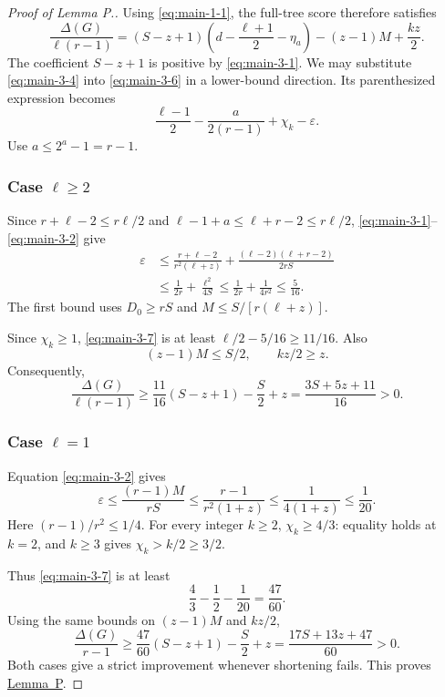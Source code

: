 \documentclass[11pt,letterpaper]{article}
\theoremstyle{plain}
\begin{document}
\begin{proof}[Proof of Lemma P.]
Using \eqref{eq:main-1-1}, the full-tree score therefore satisfies \[
\boxed{
\frac{\Delta(G)}{\ell(r-1)}
=(S-z+1)\left(d-\frac{\ell+1}{2}-\eta_a\right)
-(z-1)M+\frac{kz}{2}.
}
\tag{3.6}\label{eq:main-3-6}
\] The coefficient \(S-z+1\) is positive by \eqref{eq:main-3-1}. We may substitute \eqref{eq:main-3-4} into \eqref{eq:main-3-6} in a lower-bound direction. Its parenthesized expression becomes \[
\frac{\ell-1}{2}-\frac{a}{2(r-1)}+\chi_k-\varepsilon.
\tag{3.7}\label{eq:main-3-7}
\] Use \(a\le2^a-1=r-1\).

\subsubsection*{\texorpdfstring{Case \(\ell\ge2\)}{Case ell >= 2}}\label{case-ellge2}

Since \(r+\ell-2\le r\ell/2\) and \(\ell-1+a\le\ell+r-2\le r\ell/2\), \eqref{eq:main-3-1}--\eqref{eq:main-3-2} give \[
\begin{aligned}
\varepsilon
&\le\frac{r+\ell-2}{r^2(\ell+z)}
 +\frac{(\ell-2)(\ell+r-2)}{2rS}\\
&\le\frac1{2r}+\frac{\ell^2}{4S}
\le\frac1{2r}+\frac1{4r^2}
\le\frac5{16}.
\end{aligned}
\tag{3.8}\label{eq:main-3-8}
\] The first bound uses \(D_0\ge rS\) and \(M\le S/[r(\ell+z)]\).

Since \(\chi_k\ge1\), \eqref{eq:main-3-7} is at least \(\ell/2-5/16\ge11/16\). Also \[
(z-1)M\le S/2,\qquad kz/2\ge z.
\] Consequently, \[
\frac{\Delta(G)}{\ell(r-1)}
\ge\frac{11}{16}(S-z+1)-\frac S2+z
=\boxed{\frac{3S+5z+11}{16}>0}.
\tag{3.9}\label{eq:main-3-9}
\]

\subsubsection*{\texorpdfstring{Case \(\ell=1\)}{Case ell = 1}}\label{case-ell1}

Equation \eqref{eq:main-3-2} gives \[
\varepsilon
\le\frac{(r-1)M}{rS}
\le\frac{r-1}{r^2(1+z)}
\le\frac1{4(1+z)}\le\frac1{20}.
\tag{3.10}\label{eq:main-3-10}
\] Here \((r-1)/r^2\le1/4\). For every integer \(k\ge2\), \(\chi_k\ge4/3\): equality holds at \(k=2\), and \(k\ge3\) gives \(\chi_k>k/2\ge3/2\).

Thus \eqref{eq:main-3-7} is at least \[
\frac43-\frac12-\frac1{20}=\frac{47}{60}.
\] Using the same bounds on \((z-1)M\) and \(kz/2\), \[
\frac{\Delta(G)}{r-1}
\ge\frac{47}{60}(S-z+1)-\frac S2+z
=\boxed{\frac{17S+13z+47}{60}>0}.
\tag{3.11}\label{eq:main-3-11}
\] Both cases give a strict improvement whenever shortening fails. This proves \hyperref[lem:packet]{Lemma~P}. \end{proof}
\end{document}
